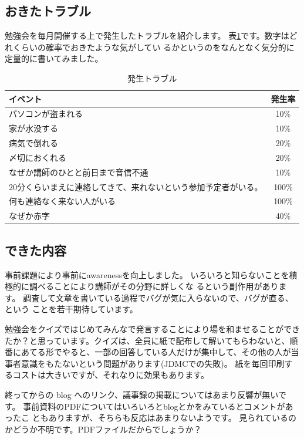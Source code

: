 \documentclass[mingoth,a4paper]{jsarticle}
\newcommand{\tbref}[1]{表\ref{#1}}
\begin{document}
\subsection{おきたトラブル}

勉強会を毎月開催する上で発生したトラブルを紹介します。
\tbref{tab:trouble}です。数字はどれくらいの確率でおきたような気がしてい
るかというのをなんとなく気分的に定量的に書いてみました。

\begin{table}[ht]
 \caption{発生トラブル}\label{tab:trouble}
 \begin{center}
  \begin{tabular}{|l|c|}
   イベント & 発生率 \\
   \hline
   パソコンが盗まれる &  10\%\\
   家が水没する &  10\%\\
   病気で倒れる &  20\%\\
   〆切におくれる &  20\%\\
   なぜか講師のひとと前日まで音信不通 &  10\%\\
   20分くらいまえに連絡してきて、来れないという参加予定者がいる。&  100\%\\
   何も連絡なく来ない人がいる &  100\%\\
   なぜか赤字 &  40\%\\
  \end{tabular}
 \end{center}
\end{table}


\subsection{できた内容}

事前課題により事前にawarenessを向上しました。
いろいろと知らないことを積極的に調べることにより講師がその分野に詳しくな
るという副作用があります。
調査して文章を書いている過程でバグが気に入らないので、バグが直る、という
ことを若干期待しています。

勉強会をクイズではじめてみんなで発言することにより場を和ませることができ
たか？と思っています。クイズは、全員に紙で配布して解いてもらわないと、順
番にあてる形でやると、一部の回答している人だけが集中して、その他の人が当
事者意識をもたないという問題があります(JDMCでの失敗)。
紙を毎回印刷するコストは大きいですが、それなりに効果もあります。

終ってからの blog へのリンク、議事録の掲載についてはあまり反響が無いです。
事前資料のPDFについてはいろいろとblogとかをみているとコメントがあったこ
ともありますが、そちらも反応はあまりないようです。
見られているのかどうか不明です。PDFファイルだからでしょうか？
\end{document}

